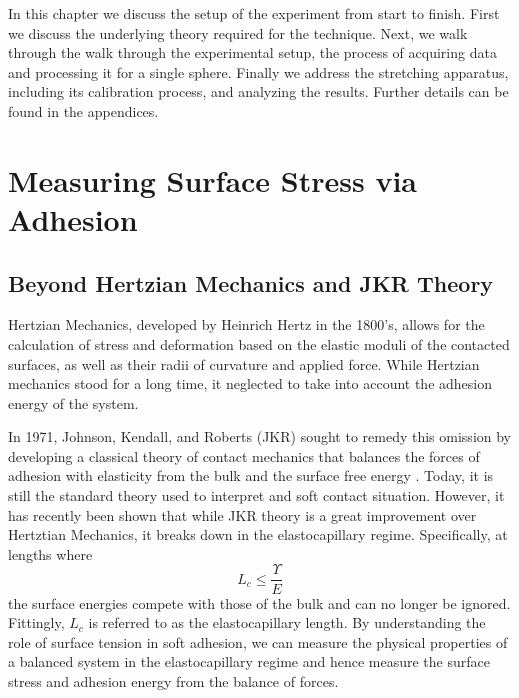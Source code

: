 In this chapter we discuss the setup of the experiment from start to finish. First we discuss the underlying theory required for the technique. Next, we walk through the walk through the experimental setup, the process of acquiring data and processing it for a single sphere. Finally we address the stretching apparatus, including its calibration process, and analyzing the results. Further details can be found in the appendices.

\section{Measuring Surface Stress via Adhesion}
\subsection{Beyond Hertzian Mechanics and JKR Theory}

Hertzian Mechanics, developed by Heinrich Hertz in the 1800's, allows for the calculation of stress and deformation based on the elastic moduli of the contacted surfaces, as well as their radii of curvature and applied force. While Hertzian mechanics stood for a long time, it neglected to take into account the adhesion energy of the system.  

In 1971, Johnson, Kendall, and Roberts (JKR) sought to remedy this omission by developing a classical theory of contact mechanics that balances the forces of adhesion with elasticity from the bulk and the surface free energy {\cite{johnson1971surface}}. Today, it is still the standard theory used to interpret and soft contact situation. However, it has recently been shown that while JKR theory is a great improvement over Hertztian Mechanics, it breaks down in the elastocapillary regime. Specifically, at lengths where 
\begin{equation}
\label{EC_regime}
L_{c} \leq \frac{\Upsilon}{E}
\end{equation}
the surface energies compete with those of the bulk and can no longer be ignored. Fittingly, $L_c$ is referred to as the elastocapillary length. By understanding the role of surface tension in soft adhesion, we can measure the physical properties of a balanced system in the elastocapillary regime and hence measure the surface stress and adhesion energy from the balance of forces.




